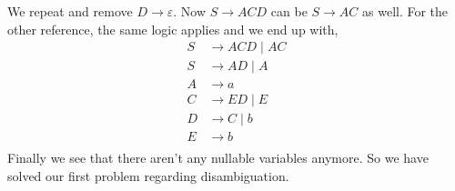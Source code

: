\documentclass{article}
\begin{document}
    We repeat and remove $D\to\varepsilon$.
    Now $S\to ACD$ can be $S\to AC$ as well. For the other reference, the same logic applies and we end up with,
    \begin{equation}
        \begin{split}
            S&\to ACD\;|\;AC\\
            S&\to AD\;|\;A\\
            A&\to a\\
            C&\to ED\;|\;E\\
            D&\to C\;|\;b\\
            E&\to b\\
        \end{split}
    \end{equation}
    Finally we see that there aren't any nullable variables anymore. So we have solved our first problem regarding disambiguation.
\end{document}
